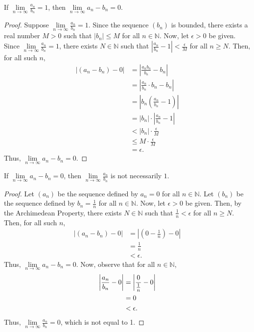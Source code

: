 \documentclass[12pt]{article}
\begin{document}
\medskip
{} If $\lim\limits_{n\to\infty}\frac{a_n}{b_n} = 1$, then $\lim\limits_{n\to\infty}a_n-b_n = 0$.
\begin{proof}
    Suppose $\lim\limits_{n\to\infty}\frac{a_n}{b_n} = 1$. Since the sequence $(b_n)$ is bounded, there exists a real number $M > 0$ such that $|b_n| \leq M$ for all $n \in \mathbb N$. Now, let $\epsilon > 0$ be given. Since $\lim\limits_{n\to\infty}\frac{a_n}{b_n} = 1$, there exists $N \in \mathbb N$ such that $|\frac{a_n}{b_n} - 1| < \frac\epsilon M$ for all $n \geq N$. Then, for all such $n$,
    \begin{align*}
        |(a_n - b_n) - 0| &= |\frac{a_nb_n}{b_n} - b_n| \\
                          &= |\frac{a_n}{b_n} \cdot b_n - b_n| \\
                          &= |b_n(\frac{a_n}{b_n} - 1)| \\
                          &= |b_n| \cdot |\frac{a_n}{b_n} - 1| \\
                          &< |b_n| \cdot \frac\epsilon M \\
                          &\leq M \cdot \frac\epsilon M \\
                          &= \epsilon.
    \end{align*}
    Thus, $\lim\limits_{n\to\infty}a_n-b_n = 0$.
\end{proof}

\newpage
{} If $\lim\limits_{n\to\infty}a_n-b_n = 0$, then $\lim\limits_{n\to\infty}\frac{a_n}{b_n}$ is not necessarily $1$.
\begin{proof}
    Let $(a_n)$ be the sequence defined by $a_n = 0$ for all $n \in \mathbb N$. Let $(b_n)$ be the sequence defined by $b_n = \frac1n$ for all $n \in \mathbb N$. Now, let $\epsilon > 0$ be given. Then, by the Archimedean Property, there exists $N \in \mathbb N$ such that $\frac1n < \epsilon$ for all $n \geq N$. Then, for all such $n$, 
    \begin{align*}
        |(a_n - b_n) - 0| &= |(0 - \frac1n) - 0| \\
                    &= \frac1n \\
                    &< \epsilon.
    \end{align*}
    Thus, $\lim\limits_{n\to\infty} a_n - b_n = 0$. Now, observe that for all $n \in \mathbb N$,
    \begin{align*}
        \bigg{|}\frac{a_n}{b_n} - 0\bigg{|} &= \bigg{|}\frac0{\frac1n} - 0\bigg{|} \\
                              &= 0 \\
                              &< \epsilon.
    \end{align*}
    Thus, $\lim\limits_{n\to\infty} \frac{a_n}{b_n} = 0$, which is not equal to 1.
\end{proof}
\end{document}
